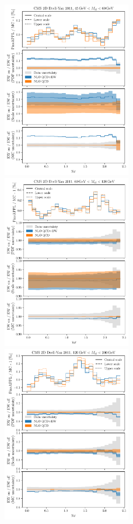 \begin{figure}[!p]
    \centering
    \includegraphics[width=0.5\textwidth]{figures/pineappl_CMSDY2D11_bin3}%
    \includegraphics[width=0.5\textwidth]{figures/pineappl_CMSDY2D11_bin4}\\
    \includegraphics[width=0.5\textwidth]{figures/pineappl_CMSDY2D11_bin5}%

\end{figure}
